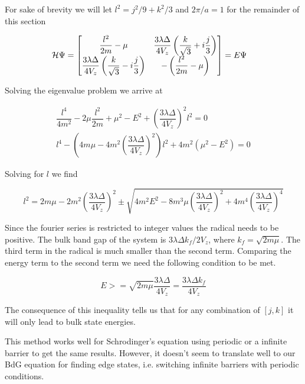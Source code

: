 For sake of brevity we will let $ l^2 = j^2/9 + k^2/3 $ and $ 2\pi/a = 1 $ for the remainder of this section

\begin{align*}
  \mathcal{H}\Psi &=
  \begin{bmatrix}
    \dfrac{l^2}{2m} -\mu & \dfrac{3\lambda\Delta}{4V_z} \left( \dfrac{k}{\sqrt{3}} + i \dfrac{j}{3} \right) \\
    \dfrac{3\lambda\Delta}{4V_z} \left( \dfrac{k}{\sqrt{3}} - i \dfrac{j}{3} \right) & -\left(\dfrac{l^2}{2m} -\mu\right)
  \end{bmatrix}
  = E\Psi
\end{align*}

Solving the eigenvalue problem we arrive at

\begin{align*}
  \dfrac{l^4}{4m^2} - 2\mu \dfrac{l^2}{2m} + \mu^2 - E^2 + \left( \dfrac{3\lambda\Delta}{4V_z} \right)^2 l^2 = 0 \\
  l^4 - \left( 4m\mu - 4m^2 \left( \dfrac{3\lambda\Delta}{4V_z} \right)^2 \right) l^2 + 4m^2 ( \mu^2 - E^2 ) = 0
\end{align*}

Solving for $l$ we find

\begin{equation}
  l^2 = 2m\mu - 2m^2 \left( \dfrac{3\lambda\Delta}{4V_z} \right)^2 \pm \sqrt{4m^2E^2 - 8m^3 \mu \left( \dfrac{3\lambda\Delta}{4V_z} \right)^2 +4m^4 \left( \dfrac{3\lambda\Delta}{4V_z} \right)^4 }
\end{equation}

Since the fourier series is restricted to integer values the radical needs to be positive.
The bulk band gap of the system is $3\lambda\Delta k_f/2V_z$, where $k_f = \sqrt{2m\mu}$.
The third term in the radical is much smaller than the second term.
Comparing the energy term to the second term we need the following condition to be met.

\begin{equation}
  E >= \sqrt{2m\mu}\dfrac{3\lambda\Delta}{4V_z} = \dfrac{3\lambda\Delta k_f}{4V_z}
\end{equation}

The consequence of this inequality tells us that for any combination of $[j, k]$ it will only lead to bulk state energies.

This method works well for Schrodinger's equation using periodic or a infinite barrier to get the same results.
However, it doesn't seem to translate well to our BdG equation for finding edge states, i.e. switching infinite barriers with periodic conditions.

